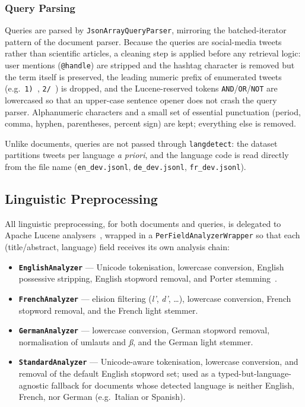 \subsubsection{Query Parsing}
Queries are parsed by \texttt{JsonArrayQueryParser}, mirroring the
batched-iterator pattern of the document parser.  Because the queries
are social-media tweets rather than scientific articles, a cleaning
step is applied before any retrieval logic: user mentions
(\texttt{@handle}) are stripped and the
hashtag character is removed but the term itself is preserved,
the leading numeric prefix of enumerated tweets (e.g.\ \texttt{1)\,},
\texttt{2/\,}) is dropped, and the Lucene-reserved tokens
\texttt{AND}/\texttt{OR}/\texttt{NOT} are lowercased so that an
upper-case sentence opener does not crash the query parser.
Alphanumeric characters and a small set of essential punctuation
(period, comma, hyphen, parentheses, percent sign) are kept; everything
else is removed.

Unlike documents, queries are not passed through \texttt{langdetect}: the dataset partitions tweets per language \textit{a priori}, and the language code is read directly from the file name (\texttt{en\_dev.jsonl}, \texttt{de\_dev.jsonl},
\texttt{fr\_dev.jsonl}).

\subsection{Linguistic Preprocessing}
\label{subsec:preprocessing}

All linguistic preprocessing, for both documents and queries, is
delegated to Apache Lucene analysers~\citep{McCandlessEtAl2010},
wrapped in a \texttt{PerFieldAnalyzerWrapper} so that each
(title/abstract, language) field receives its own analysis chain:

\begin{itemize}
  \item \textbf{\texttt{EnglishAnalyzer}} — Unicode tokenisation,
    lowercase conversion, English possessive stripping, English
    stopword removal, and Porter stemming~\citep{Porter1980}.
  \item \textbf{\texttt{FrenchAnalyzer}} — elision filtering
    (\textit{l'}, \textit{d'}, \ldots), lowercase conversion, French
    stopword removal, and the French light stemmer.
  \item \textbf{\texttt{GermanAnalyzer}} — lowercase conversion,
    German stopword removal, normalisation of umlauts and \textit{\ss},
    and the German light stemmer.
  \item \textbf{\texttt{StandardAnalyzer}} — Unicode-aware
    tokenisation, lowercase conversion, and removal of the default
    English stopword set; used as a typed-but-language-agnostic
    fallback for documents whose detected language is neither English,
    French, nor German (e.g.\ Italian or Spanish).
\end{itemize}

